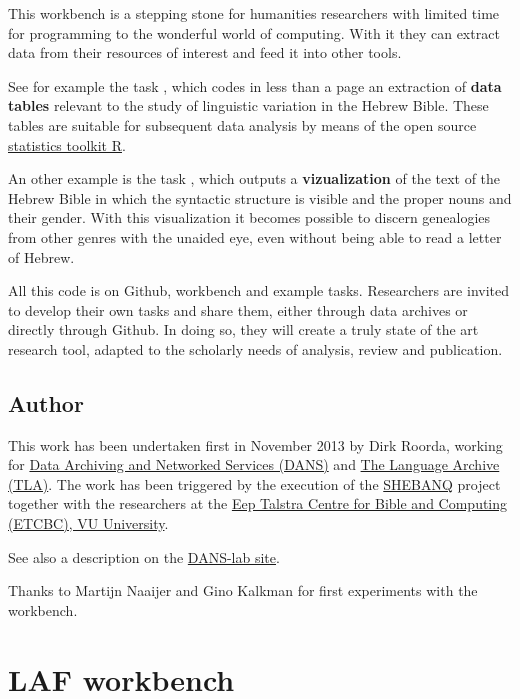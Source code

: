 \documentclass[letterpaper,10pt,english]{sphinxmanual}
\begin{document}
This workbench is a stepping stone for humanities researchers with limited time for programming
to the wonderful world of computing. With it they can extract data from their resources of interest and
feed it into other tools.

See for example the task {\hyperref[tasks/esther:module-esther]{}}, which codes in less than a page an extraction of \textbf{data tables} relevant to the
study of linguistic variation in the Hebrew Bible. These tables are suitable for subsequent data analysis
by means of the open source \href{http://www.r-project.org}{statistics toolkit R}.

An other example is the task {\hyperref[tasks/proper:module-proper]{}}, which outputs a \textbf{vizualization} of the text of the Hebrew Bible in which
the syntactic structure is visible and the proper nouns and their gender.
With this visualization it becomes possible to discern genealogies from other genres with the unaided eye,
even without being able to read a letter of Hebrew.

All this code is on Github, workbench and example tasks.
Researchers are invited to develop their own tasks and share them, either through data archives or directly through
Github. In doing so, they will create a truly state of the art research tool, adapted to
the scholarly needs of analysis, review and publication.


\section{Author}
\label{overview:id5}\label{overview:author}
This work has been undertaken first in November 2013 by Dirk Roorda, working for
\href{http://www.dans.knaw.nl/en}{Data Archiving and Networked Services (DANS)} and
\href{http://tla.mpi.nl}{The Language Archive (TLA)}.
The work has been triggered by the execution of the
\href{http://www.slideshare.net/dirkroorda/shebanq-gniezno}{SHEBANQ} project
together with the researchers at the
\href{http://www.godgeleerdheid.vu.nl/nl/onderzoek/instituten-en-centra/eep-talstra-centre-for-bible-and-computer/index.asp}{Eep Talstra Centre for Bible and Computing (ETCBC), VU University}.

See also a description on the \href{http://demo.datanetworkservice.nl/mediawiki/index.php/LAF\_Fabric}{DANS-lab site}.

Thanks to Martijn Naaijer and Gino Kalkman for first experiments with the workbench.


\chapter{LAF workbench}
\label{workbench:laf-workbench}\label{workbench::doc}
\end{document}
